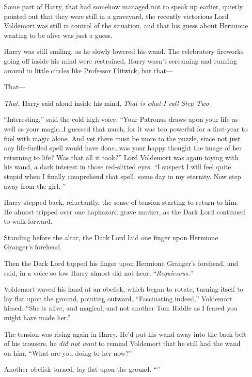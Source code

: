 Some part of Harry, that had somehow managed not to speak up earlier, quietly pointed out that they were still in a graveyard, the recently victorious Lord Voldemort was still in control of the situation, and that his guess about Hermione wanting to be alive was just a guess.

Harry was still smiling, as he slowly lowered his wand. The celebratory fireworks going off inside his mind were restrained, Harry wasn’t screaming and running around in little circles like Professor Flitwick, but that—

That—

\emph{\emph{That},} Harry said aloud inside his mind, \emph{\emph{That} is what I call Step Two.}

“Interesting,” said the cold high voice. “Your Patronus draws upon your life as well as your magic…I guessed that much, for it was too powerful for a first-year to fuel with magic alone. And yet there must be more to the puzzle, since not just any life-fuelled spell would have done…was your happy thought the image of her returning to life? Was that all it took?” Lord Voldemort was again toying with his wand, a dark interest in those red-slitted eyes. “I suspect I will feel quite stupid when I finally comprehend that spell, some day in my eternity. Now step away from the girl. ”

Harry stepped back, reluctantly, the sense of tension starting to return to him. He almost tripped over one haphazard grave marker, as the Dark Lord continued to walk forward.

Standing before the altar, the Dark Lord laid one finger upon Hermione Granger’s forehead.

Then the Dark Lord tapped his finger upon Hermione Granger’s forehead, and said, in a voice so low Harry almost did not hear, “\emph{Requiescus.}”

Voldemort waved his hand at an obelisk, which began to rotate, turning itself to lay flat upon the ground, pointing outward. “Fascinating indeed,” Voldemort hissed. “She is alive, and magical, and not another Tom Riddle as I feared you might have made her.”

The tension was rising again in Harry. He’d put his wand away into the back belt of his trousers, he \emph{did not want} to remind Voldemort that he still had the wand on him. “What are you doing to her now?”

Another obelisk turned, lay flat upon the ground. “”

